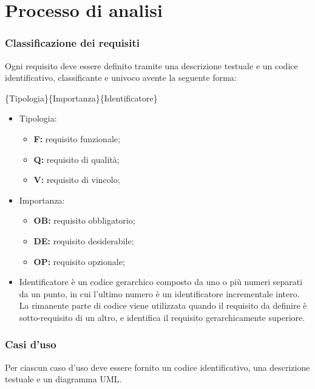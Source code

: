 \section{Processo di analisi}
\subsubsection{Classificazione dei requisiti}
Ogni requisito deve essere definito tramite  una descrizione testuale e un codice identificativo, classificante e univoco avente la seguente forma:

\begin{center}\{Tipologia\}\{Importanza\}\{Identificatore\}\end{center}


\begin{itemize}

\item Tipologia:
\begin{itemize}
\item \textbf{F:} requisito funzionale;
\item \textbf{Q:} requisito di qualità;
\item \textbf{V:} requisito di vincolo;
\end{itemize}

\item Importanza:
\begin{itemize}
\item \textbf{OB:} requisito obbligatorio;
\item \textbf{DE:} requisito desiderabile;
\item \textbf{OP:} requisito opzionale;
\end{itemize}

\item Identificatore è un codice gerarchico composto da uno o più numeri separati da un punto, in cui l'ultimo numero è un identificatore incrementale intero.\\
La rimanente parte di codice viene utilizzata quando il requisito da definire è sotto-requisito di un altro, e identifica il requisito gerarchicamente superiore.

\end{itemize}

\subsubsection{Casi d'uso}
Per ciascun caso d'uso deve essere fornito un codice identificativo, una descrizione testuale e un diagramma UML.

